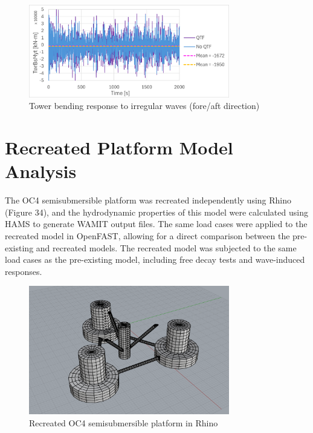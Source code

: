 \documentclass[a4paper, 11pt]{article}
\begin{document}
\begin{figure}[H]
    \centering
    \includegraphics[width=0.78\textwidth]{2.2_twr.png}
    \caption{\small Tower bending response to irregular waves (fore/aft direction)}
    \label{fig:2.2_twr}
\end{figure}

\section{Recreated Platform Model Analysis}

\hspace*{0.5cm}The OC4 semisubmersible platform was recreated independently using Rhino (Figure 34), and the hydrodynamic properties of this model were calculated using HAMS to generate WAMIT output files. The same load cases were applied to the recreated model in OpenFAST, allowing for a direct comparison between the pre-existing and recreated models.
The recreated model was subjected to the same load cases as the pre-existing model, including free decay tests and wave-induced responses.

\begin{figure}[H]
    \centering
    \includegraphics[width=0.78\textwidth]{rhino.png}
    \caption{\small Recreated OC4 semisubmersible platform in Rhino}
    \label{fig:rhino}
\end{figure}
\end{document}
